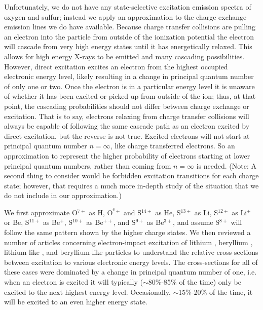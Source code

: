 \documentclass[draft]{agujournal2018}
\begin{document}
Unfortunately, we do not have any state-selective excitation emission spectra of oxygen and sulfur; instead we apply an approximation to the charge exchange emission lines we do have available.
Because charge transfer collisions are pulling an electron into the particle from outside of the ionization potential the electron will cascade from very high energy states until it has energetically relaxed.
This allows for high energy X-rays to be emitted and many cascading possibilities.
However, direct excitation excites an electron from the highest occupied electronic energy level, likely resulting in a change in principal quantum number of only one or two.
Once the electron is in a particular energy level it is unaware of whether it has been excited or picked up from outside of the ion; thus, at that point, the cascading probabilities should not differ between charge exchange or excitation.
That is to say, electrons relaxing from charge transfer collisions will always be capable of following the same cascade path as an electron excited by direct excitation, but the reverse is not true.
Excited electrons will not start at principal quantum number $n=\infty$, like charge transferred electrons.
So an approximation to represent the higher probability of electrons starting at lower principal quantum numbers, rather than coming from $n=\infty$ is needed.
(Note: A second thing to consider would be forbidden excitation transitions for each charge state; however, that requires a much more in-depth study of the situation that we do not include in our approximation.)

We first approximate O$^{7+}$ as H, O$^{^6+}$ and S$^{14+}$ as He, S$^{13+}$ as Li, S$^{12+}$ as Li$^{+}$ or Be, S$^{11+}$ as Be$^{+}$, S$^{10+}$ as Be$^{++}$, and S$^{9+}$ as Be$^{3+}$, and assume S$^{8+}$ will follow the same pattern shown by the higher charge states.
We then reviewed a number of articles concerning electron-impact excitation of lithium \citep{griffin2001}, beryllium \citep{bartschat1996}, lithium-like \citep{bely1966}, and beryllium-like \citep{bartschat1996} particles to understand the relative cross-sections between excitation to various electronic energy levels.
The cross-sections for all of these cases were dominated by a change in principal quantum number of one, i.e. when an electron is excited it will typically ($\sim$80$\%$-85$\%$ of the time) only be excited to the next highest energy level.
Occasionally, $\sim$15$\%$-20$\%$  of the time, it will be excited to an even higher energy state.
\end{document}

